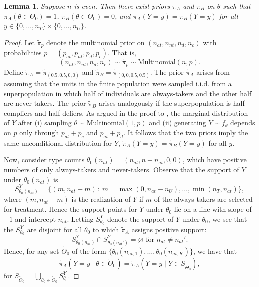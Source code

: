 \documentclass[12pt,reqno]{amsart}
\theoremstyle{theorem}
\newtheorem{lem}{Lemma}[section]
\theoremstyle{definition}
\let\emptyset\varnothing
\newcommand{\0}{\mathbf{0}}
\newcommand{\1}{\mathbf{1}}
\begin{document}
\begin{lem} \label{lem: there exist equiv priors on the null and alt}
Suppose $n$ is even. Then there exist priors $\pi_A$ and $\pi_B$ on $\theta$
such
that $\pi_A(\theta \in \Theta_0) = 1$, $\pi_B(\theta \in \Theta_0) = 0$, and $\pi_A(Y{=}y)
= \pi_B(Y{=}y)$ for all $y \in \{0,\ldots,n_T\} \times \{0,\ldots, n_U\}$.     
\end{lem}
\begin{proof}
Let $\tilde{\pi}_p$ denote the multinomial prior on $(n_{at},n_{nt},n_{d},n_{c})$ with
probabilities $p = (p_{at},p_{nt},p_{d},p_{c})$. That is, \[
(n_{at},n_{nt},n_{d},n_{c}) \sim \tilde\pi_p \sim \mathrm{Multinomial}(n, p).
\] 
Define $\tilde{\pi}_A = \tilde{\pi}_{(0.5,0.5,0,0)}$ and $\tilde{\pi}_B =
 \tilde{\pi}_{(0,0,0.5,0.5)}$. The prior $\tilde{\pi}_A$ arises from assuming that the
 units in the finite population were sampled i.i.d. from a superpopulation in which half
 of individuals are always-takers and the other half are never-takers. The prior
 $\tilde{\pi}_B$ arises analogously if the superpopulation is half compliers and half
 defiers. As argued in the proof to , the marginal distribution of $Y$ after (i) sampling $\theta \sim \mathrm{Multinomial}(1, p)$ and (ii) generating $Y \sim f_{\theta}$ depends on $p$ only through $p_{at}+p_c$ and $p_{at} + p_d$. It follows that the two priors imply the same unconditional distribution for $Y$, $\tilde\pi_A(Y{=}y) = \tilde\pi_B(Y{=}y)$ for all $y$. 


Now, consider type counts $\theta_0(n_{at}) = (n_{at}, n-n_{at}, 0,0)$, which have positive numbers of only always-takers and never-takers. Observe that the support
of $Y$ under $\theta_0(n_{at})$ is
\begin{equation}
  S^Y_{\theta_0(n_{at})} = \{ (m,n_{at}-m) \,:\, m = \max(0, n_{at}-n_U) ,\ldots,\min(n_T,n_{at}) \}, \label{eqn:s0}  
\end{equation} where $(m,n_{at}-m)$ is the realization of $Y$ if
$m$ of the always-takers are selected for treatment. Hence the support points for $Y$ under
$\theta_0$ lie on a line with slope of $-1$ and intercept $n_{at}$. Letting $S^Y_{\theta_0}$
denote the support of $Y$ under $\theta_0$, we see that the $S^Y_{\theta_0}$ are disjoint
for all $\theta_0$ to which $\tilde{\pi}_A$ assigns positive support: \[
S^Y_{\theta_0(n_{at})} \cap S^Y_{\theta_0(n_{at}')} = \emptyset \text{ for $n_{at} \neq
n_{at}'$}
.\] Hence, for any
set
$\tilde{\Theta}_0$ of the form $\{ \theta_0(n_{at,1}), \ldots, \theta_0(n_{at,K}) \}$, we have that $$\tilde{\pi}_{A}(Y=y \mid \theta \in
\tilde{\Theta}_0) = \tilde{\pi}_A( Y=y \mid Y \in S_{\tilde{\Theta}_0}),$$ for
$S_{\tilde{\Theta}_0} = \bigcup_{\theta_0 \in \tilde\Theta_0} S^{Y}_{\theta_0}$.


\end{proof}
\end{document}
